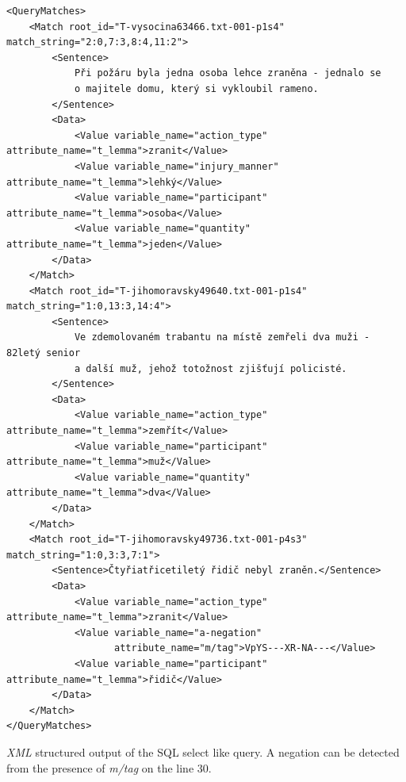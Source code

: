 \begin{listing}[ht]
\begin{verbatim}
<QueryMatches>
	<Match root_id="T-vysocina63466.txt-001-p1s4" match_string="2:0,7:3,8:4,11:2">
		<Sentence>
			Při požáru byla jedna osoba lehce zraněna - jednalo se
			o majitele domu, který si vykloubil rameno.
		</Sentence>
		<Data>
			<Value variable_name="action_type" attribute_name="t_lemma">zranit</Value>
			<Value variable_name="injury_manner" attribute_name="t_lemma">lehký</Value>
			<Value variable_name="participant" attribute_name="t_lemma">osoba</Value>
			<Value variable_name="quantity" attribute_name="t_lemma">jeden</Value>
		</Data>
	</Match>
	<Match root_id="T-jihomoravsky49640.txt-001-p1s4" match_string="1:0,13:3,14:4">
		<Sentence>
			Ve zdemolovaném trabantu na místě zemřeli dva muži - 82letý senior
			a další muž, jehož totožnost zjišťují policisté.
		</Sentence>
		<Data>
			<Value variable_name="action_type" attribute_name="t_lemma">zemřít</Value>
			<Value variable_name="participant" attribute_name="t_lemma">muž</Value>
			<Value variable_name="quantity" attribute_name="t_lemma">dva</Value>
		</Data>
	</Match>
	<Match root_id="T-jihomoravsky49736.txt-001-p4s3" match_string="1:0,3:3,7:1">
		<Sentence>Čtyřiatřicetiletý řidič nebyl zraněn.</Sentence>
		<Data>
			<Value variable_name="action_type" attribute_name="t_lemma">zranit</Value>
			<Value variable_name="a-negation" 
			       attribute_name="m/tag">VpYS---XR-NA---</Value>
			<Value variable_name="participant" attribute_name="t_lemma">řidič</Value>
		</Data>
	</Match>
</QueryMatches>
\end{verbatim}
\caption{\emph{XML} structured output of the SQL select like query. A negation can be detected from the presence of \emph{m/tag} on the line 30.}
\label{lst:select_xml}
\end{listing}


